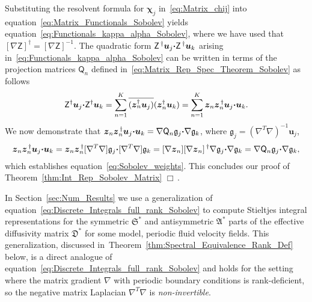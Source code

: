 \documentclass[english,12pt,jmp,graphicx]{revtex4-1}
\newcommand{\vecu}{\boldsymbol{u}}
\newcommand{\vecz}{\boldsymbol{z}}
\newcommand{\vecg}{\mathfrak{g}}
\newcommand{\thmref}[1]{Theorem~\ref{#1}}
\newcommand{\secref}[1]{Section~\ref{#1}}
\newcommand{\bcdot}{\mbox{\boldmath${\cdot}$}}
\newcommand{\Sg}{\mathfrak{S}}
\newcommand{\Ag}{\mathfrak{A}}
\newcommand{\Dg}{\mathfrak{D}}
\newcommand{\vecchi}{\boldsymbol{\chi}}
\newcommand{\Zm}{\mathsf{Z}}
\newcommand{\Qm}{\mathsf{Q}}
\begin{document}
Substituting the resolvent formula for $\vecchi_j$
in~\eqref{eq:Matrix_chij} into
equation~\eqref{eq:Matrix_Functionals_Sobolev}  yields
equation~\eqref{eq:Functionals_kappa_alpha_Sobolev}, 
where we have used that $[\nabla\Zm]^\dagger=[\nabla\Zm]^{-1}$. The
quadratic form $\Zm^{\,\dagger}\vecu_j\bcdot\Zm^{\,\dagger}\vecu_k$ arising
in~\eqref{eq:Functionals_kappa_alpha_Sobolev} can be written in terms
of the projection matrices $\Qm_n$ defined
in~\eqref{eq:Matrix_Rep_Spec_Theorem_Sobolev} as follows
%
\begin{align}\label{eq:Quadratic_Z}
  \Zm^\dagger\vecu_j\bcdot\Zm^\dagger\vecu_k
  =\sum_{n=1}^K\overline{(\vecz_n^\dagger\vecu_j)}(\vecz_n^\dagger\vecu_k)
  =\sum_{n=1}^K\vecz_n\vecz_n^{\,\dagger}\vecu_j\bcdot\vecu_k.
\end{align}
%
We now demonstrate that
$\vecz_n\vecz_n^{\,\dagger}\vecu_j\bcdot\vecu_k
=\nabla\Qm_n\vecg_j\bcdot\nabla\vecg_k$, 
where $\vecg_j=(\nabla^T\nabla)^{-1}\vecu_j$,   
%
\begin{align}\label{eq:Sobolev_weights_tfm}
  \vecz_n\vecz_n^{\,\dagger}\vecu_j\bcdot\vecu_k
  =\vecz_n\vecz_n^{\,\dagger}[\nabla^T\nabla]\vecg_j\bcdot[\nabla^T\nabla]\vecg_k
  =[\nabla\vecz_n][\nabla\vecz_n]^{\,\dagger}\nabla\vecg_j\bcdot\nabla\vecg_k
  =\nabla\Qm_n\vecg_j\bcdot\nabla\vecg_k,
\end{align}
%
which establishes equation~\eqref{eq:Sobolev_weights}. This concludes
our proof of \thmref{thm:Int_Rep_Sobolev_Matrix} $\Box\,.$



In \secref{sec:Num_Results} we use a generalization of
equation~\eqref{eq:Discrete_Integrals_full_rank_Sobolev} to compute Stieltjes
integral representations for the symmetric $\Sg^*$ and antisymmetric
$\Ag^*$ parts of the effective diffusivity matrix $\Dg^*$ for some
model, periodic fluid velocity fields. This generalization,
discussed in~\thmref{thm:Spectral_Equivalence_Rank_Def} below,
is a direct analogue of
equation~\eqref{eq:Discrete_Integrals_full_rank_Sobolev} and holds 
for the setting where the matrix gradient $\nabla$ with periodic
boundary conditions is rank-deficient, so the negative matrix
Laplacian $\nabla^T\nabla$ is \emph{non-invertible}.
\end{document}
